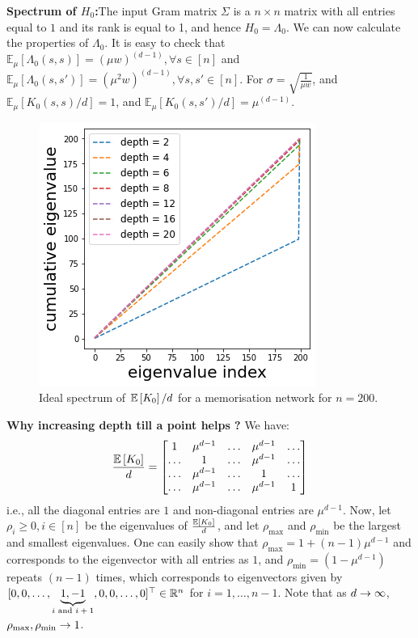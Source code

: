 \begin{appendix}
\textbf{Spectrum of $H_0$:}The input Gram matrix $\Sigma$ is a $n\times n$ matrix with all entries equal to $1$ and its rank is equal to 1, and hence $H_0=\Lambda_0$. We can now calculate the properties of $\Lambda_0$. It is easy to check that $\mathbb{E}_{\mu}\left[\Lambda_0(s,s)\right]=(\mu w)^{(d-1)},\forall s\in[n]$ and $\mathbb{E}_{\mu}\left[\Lambda_0(s,s')\right]=(\mu^2 w)^{(d-1)},\forall s,s'\in[n]$.  For $\sigma=\sqrt{\frac{1}{\mu w}}$, and $\mathbb{E}_{\mu}\left[K_0(s,s)/d\right]=1$, and $\mathbb{E}_{\mu}\left[K_0(s,s')/d\right]=\mu^{(d-1)}$. 
\begin{figure}
\centering
\includegraphics[scale=0.3]{figs/dgn-fra-ecdf-ideal-small.png}
\caption{Ideal spectrum of $\mathbb{E}\left[K_0\right]/d$ for a memorisation network for $n=200$.}
\label{fig:ideal-spectrum}
\end{figure}


\textbf{Why increasing depth till a point helps ?} 
We have:
\begin{align}\label{eq:mat}
\frac{\mathbb{E}\left[K_0\right]}{d}=\left[\begin{matrix}
1 &\mu^{d-1} &\ldots &\mu^{d-1} &\ldots\\ 
\ldots &1 &\ldots &\mu^{d-1} &\ldots\\ 
\ldots &\mu^{d-1} &\ldots &1 &\ldots \\
\ldots &\mu^{d-1} &\ldots &\mu^{d-1} &1\\ 
\end{matrix}\right]
\end{align}
i.e., all the diagonal entries are $1$ and non-diagonal entries are $\mu^{d-1}$. Now, let $\rho_i\geq 0,i \in [n]$ be the eigenvalues of $\frac{\mathbb{E}\left[K_0\right]}{d}$, and let $\rho_{\max}$ and $\rho_{\min}$ be the largest and smallest eigenvalues.  One can easily show that $\rho_{\max}=1+(n-1)\mu^{d-1}$ and corresponds to the eigenvector with all entries as $1$, and $\rho_{\min}=(1-\mu^{d-1})$ repeats $(n-1)$ times,  which corresponds to eigenvectors given by $[0, 0, \ldots, \underbrace{1, -1}_{\text{$i$ and $i+1$}}, 0,0,\ldots, 0]^\top \in \mathbb{R}^n$ for $i=1,\ldots,n-1$. Note that as $d\rightarrow\infty$, $\rho_{\max},\rho_{\min}\rightarrow 1$.


\end{appendix}
